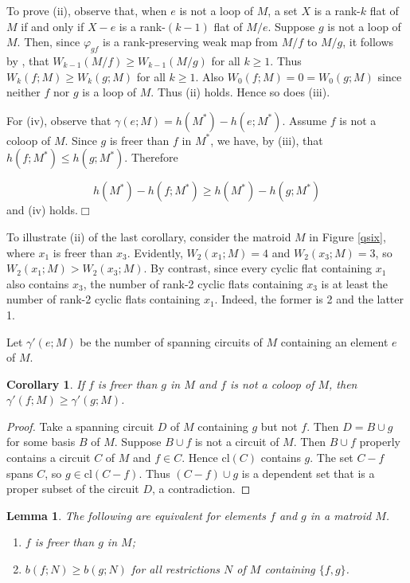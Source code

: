 \documentclass[12pt,reqno]{amsart}
\newtheorem{lemma}[theorem]{Lemma}
\newtheorem{corollary}[theorem]{Corollary}
\theoremstyle{definition}
\theoremstyle{remark}
\numberwithin{equation}{section}
\newcommand{\cl}{\text{cl}}
\begin{document}
     To prove (ii), observe that, when $e$ is not a loop of $M$, a set $X$ is a rank-$k$ flat of $M$ if and only if $X-e$ is a rank-$(k-1)$ flat of $M/e$. 
     Suppose $g$ is not a loop of $M$. 
     Then, since $\varphi_{gf}$ is a rank-preserving weak map from $M/f$ to $M/g$, it follows by \cite[Proposition 9.3.3]{kung}, that $W_{k-1}(M/f)\geq W_{k-1}(M/g)$ for all $k\geq 1$. Thus $W_{k}(f;M)\geq W_{k}(g;M)$ for all $k\geq 1$. Also  $W_{0}(f;M)=0=W_{0}(g;M)$ since neither $f$ nor $g$ is a loop of $M$. Thus (ii) holds. Hence so does (iii).  

    For (iv), observe that $\gamma(e;M)=h(M^*)-h(e;M^*)$. Assume $f$ is not a coloop of $M$. Since $g$ is freer than $f$ in $M^*$, we have, by (iii), that $h(f;M^*)\leq h(g;M^*)$. Therefore 

    $$h(M^*)-h(f;M^*)\geq h(M^*)-h(g;M^*)$$ and (iv) holds.\hfill $\Box$ 

 \qquad

To illustrate (ii) of the last corollary, consider the matroid $M$ in Figure \ref{qsix}, where $x_1$ is freer than $x_3$. 
Evidently, $W_2(x_1;M)=4$ and $W_2(x_3;M)=3$, so $W_2(x_1;M)>W_2(x_3;M)$. 
By contrast, since every cyclic flat containing $x_1$ also contains $x_3$, the number of rank-2 cyclic flats containing $x_3$ is at least the number of rank-2 cyclic flats containing $x_1$. Indeed, the former is 2 and the latter 1. 

Let $\gamma'(e;M)$ be the number of spanning circuits of $M$ containing an element $e$ of $M$.  

    \begin{corollary}
        If $f$ is freer than $g$ in $M$ and $f$ is not a coloop of $M$, then $\gamma'(f;M)\geq \gamma'(g;M)$.     
    \end{corollary}
    
        \begin{proof}
           Take a spanning circuit $D$ of $M$ containing $g$ but not $f$. Then $D=B\cup g$ for some basis $B$ of $M$. Suppose $B \cup f$ is not a circuit of $M$. Then $B\cup f$ properly contains a circuit $C$ of $M$ and $f\in C$. Hence $\cl(C)$ contains $g$. The set $C-f$ spans $C$, so $g \in \cl(C-f)$. Thus $(C-f)\cup g$ is a dependent set that is a proper subset of the circuit $D$, a contradiction.  
        \end{proof}

        {\begin{lemma}\label{restriction}
        The following are equivalent for elements $f$ and $g$ in a matroid $M$. 
        \begin{enumerate}[label=(\roman*)]
            \item $f$ is freer than $g$ in $M$;  
            \item $b(f;N)\geq b(g;N)$ for all restrictions $N$ of $M$ containing $\{f,g\}$. 
        \end{enumerate}
    \end{lemma}}
\end{document}
